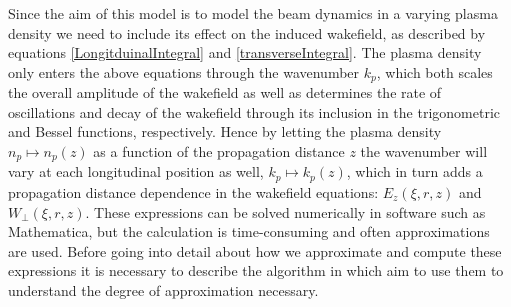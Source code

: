 Since the aim of this model is to model the beam dynamics in a varying plasma density we need to include its effect on the induced wakefield, as described by equations \ref{LongitduinalIntegral} and \ref{transverseIntegral}. The plasma density only enters the above equations through the wavenumber $k_p$, which both scales the overall amplitude of the wakefield as well as determines the rate of oscillations and decay of the wakefield through its inclusion in the trigonometric and Bessel functions, respectively. Hence by letting the plasma density $n_p\mapsto n_p(z)$ as a function of the propagation distance $z$ the wavenumber will vary at each longitudinal position as well, $k_p\mapsto k_p(z)$, which in turn adds a propagation distance dependence in the wakefield equations: $E_{z}(\xi,r,z)$ and $W_{\perp}(\xi,r,z)$. These expressions can be solved numerically in software such as Mathematica, but the calculation is time-consuming and often approximations are used. Before going into detail about how we approximate and  compute these expressions it is necessary to describe the algorithm in which aim to use them to understand the degree of approximation necessary. 
